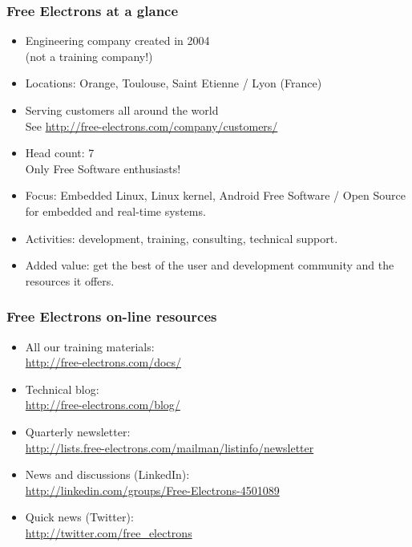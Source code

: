 \begin{frame}
\frametitle{Free Electrons at a glance}
  \begin{itemize}
    \item Engineering company created in 2004 \\
          (not a training company!) 
    \item Locations: Orange, Toulouse, Saint Etienne / Lyon (France)
    \item Serving customers all around the world \\
          See \url{http://free-electrons.com/company/customers/}
    \item Head count: 7 \\
	  Only Free Software enthusiasts!
    \item Focus: Embedded Linux, Linux kernel, Android
          Free Software / Open Source
          for embedded and real-time systems.
    \item Activities: development, training, consulting, technical
          support.
    \item Added value: get the best of the user and development
          community and the resources it offers.
  \end{itemize}
\end{frame}

\begin{frame}
\frametitle{Free Electrons on-line resources}
  \begin{itemize}
    \item All our training materials:\\
          \url{http://free-electrons.com/docs/}
    \item Technical blog:\\
          \url{http://free-electrons.com/blog/} 
    \item Quarterly newsletter:\\
 	  \url{http://lists.free-electrons.com/mailman/listinfo/newsletter}
    \item News and discussions (LinkedIn):\\
	  \url{http://linkedin.com/groups/Free-Electrons-4501089}
    \item Quick news (Twitter):\\
          \url{http://twitter.com/free_electrons}
  \end{itemize}
\end{frame}
